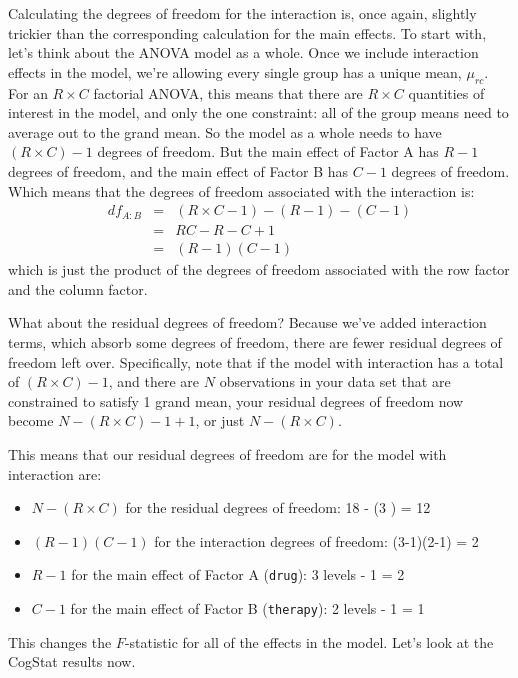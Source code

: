 \documentclass[
  11pt,
  a4paper,
  twoside,symmetric,openright]{book}
\providecommand{\tightlist}{%
  \setlength{\itemsep}{0pt}\setlength{\parskip}{0pt}}
\theoremstyle{break}
\theoremstyle{break}
\begin{document}
Calculating the degrees of freedom for the interaction is, once again, slightly trickier than the corresponding calculation for the main effects. To start with, let's think about the ANOVA model as a whole. Once we include interaction effects in the model, we're allowing every single group has a unique mean, \(\mu_{rc}\). For an \(R \times C\) factorial ANOVA, this means that there are \(R \times C\) quantities of interest in the model, and only the one constraint: all of the group means need to average out to the grand mean. So the model as a whole needs to have \((R\times C) - 1\) degrees of freedom. But the main effect of Factor A has \(R-1\) degrees of freedom, and the main effect of Factor B has \(C-1\) degrees of freedom. Which means that the degrees of freedom associated with the interaction is:
\[
\begin{array}{rcl}
{df}_{A:B} &=& (R\times C - 1) - (R - 1) - (C -1 ) \\
&=& RC - R - C + 1 \\
&=& (R-1)(C-1)
\end{array}
\]
which is just the product of the degrees of freedom associated with the row factor and the column factor.

What about the residual degrees of freedom? Because we've added interaction terms, which absorb some degrees of freedom, there are fewer residual degrees of freedom left over. Specifically, note that if the model with interaction has a total of \((R \times C) - 1\), and there are \(N\) observations in your data set that are constrained to satisfy 1 grand mean, your residual degrees of freedom now become \(N-(R \times C)-1+1\), or just \(N-(R \times C)\).

This means that our residual degrees of freedom are for the model with interaction are:

\begin{itemize}
\tightlist
\item
  \(N-(R \times C)\) for the residual degrees of freedom: 18 - (3 ) = 12
\item
  \((R-1)(C-1)\) for the interaction degrees of freedom: (3-1)(2-1) = 2
\item
  \(R-1\) for the main effect of Factor A (\texttt{drug}): 3 levels - 1 = 2
\item
  \(C-1\) for the main effect of Factor B (\texttt{therapy}): 2 levels - 1 = 1
\end{itemize}

This changes the \(F\)-statistic for all of the effects in the model. Let's look at the CogStat results now.
\end{document}
